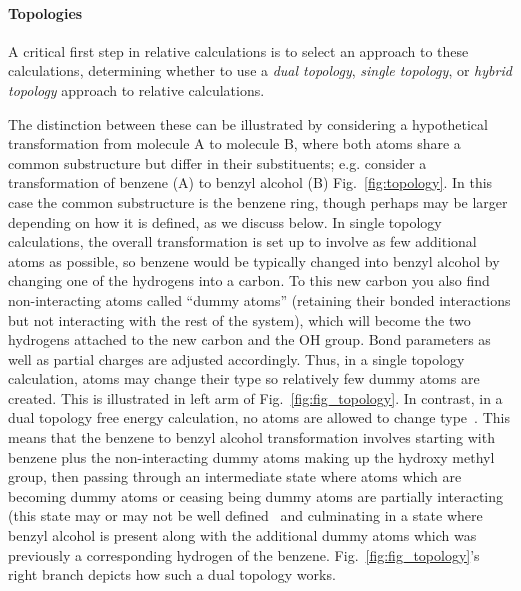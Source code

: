\documentclass[9pt,bestpractices]{livecoms}
\begin{document}
\paragraph{Topologies} A critical first step in relative calculations is to select an approach to these calculations, determining whether to use a \emph{dual topology}, \emph{single topology}, or \emph{hybrid topology} approach to relative calculations.

The distinction between these can be illustrated by considering a hypothetical transformation from molecule A to molecule B, where both atoms share a common substructure but differ in their substituents; e.g. consider a transformation of benzene (A) to benzyl alcohol (B) Fig.~\ref{fig:topology}.
In this case the common substructure is the benzene ring, though perhaps may be larger depending on how it is defined, as we discuss below.
In single topology calculations, the overall transformation is set up to involve as few additional atoms as possible, so benzene would be typically changed into benzyl alcohol by changing one of the hydrogens into a carbon. To this new carbon you also find non-interacting atoms called ``dummy atoms'' (retaining their bonded interactions but not interacting with the rest of the system), which will become the two hydrogens attached to the new carbon and the OH group. Bond parameters as well as partial charges are adjusted accordingly. 
Thus, in a single topology calculation, atoms may change their type so relatively few dummy atoms are created. This is illustrated in left arm of Fig.~\ref{fig:fig_topology}. 
In contrast, in a dual topology free energy calculation, no atoms are allowed to change type~\cite{shirts2012best}. This means that the benzene to benzyl alcohol transformation involves starting with benzene plus the non-interacting dummy atoms making up the hydroxy methyl group, then passing through an intermediate state where atoms which are becoming dummy atoms or ceasing being dummy atoms are partially interacting (this state may or may not be well defined~\cite{mobley2014blind}  and culminating in a state where benzyl alcohol is present along with the additional dummy atoms which was previously a corresponding hydrogen of the benzene. Fig.~\ref{fig:fig_topology}'s right branch depicts how such a dual topology works. 
\end{document}
